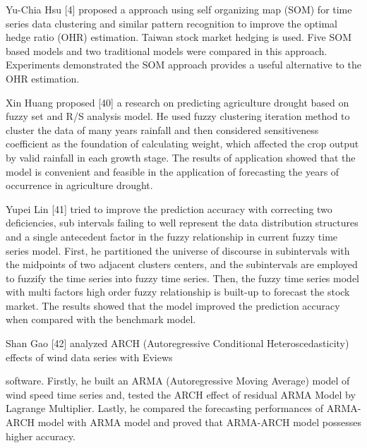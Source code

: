 Yu-Chia Hsu [4] proposed a approach using self organizing map (SOM) for time series data clustering and similar pattern recognition to improve the optimal hedge ratio (OHR) estimation. Taiwan stock market hedging is used. Five SOM based models and two traditional models were compared in this approach. Experiments demonstrated the SOM approach provides a useful alternative to the OHR estimation.

Xin Huang proposed [40] a research on predicting agriculture drought based on fuzzy set and R/S analysis model. He used fuzzy clustering iteration method to cluster the data of many years rainfall and then considered sensitiveness coefficient as the foundation of calculating weight, which affected the crop output by valid rainfall in each growth stage. The results of application showed that the model is convenient and feasible in the application of forecasting the years of occurrence in agriculture drought.

Yupei Lin [41] tried to improve the prediction accuracy with correcting two deficiencies, sub intervals failing to well represent the data distribution structures and a single antecedent factor in the fuzzy relationship in current fuzzy time series model. First, he partitioned the universe of discourse in subintervals with the midpoints of two adjacent clusters centers, and the subintervals are employed to fuzzify the time series into fuzzy time series. Then, the fuzzy time series model with multi factors high order fuzzy relationship is built-up to forecast the stock market. The results showed that the model improved the prediction accuracy when compared with the benchmark model.

Shan Gao [42] analyzed ARCH (Autoregressive Conditional
Heteroscedasticity) effects of wind data series with Eviews 

software. Firstly, he built an ARMA (Autoregressive Moving Average)  model of wind  speed  time  series and, tested the ARCH effect of residual ARMA Model by Lagrange Multiplier. Lastly, he compared the forecasting performances of ARMA-ARCH model with ARMA model and proved that ARMA-ARCH model possesses higher accuracy.


